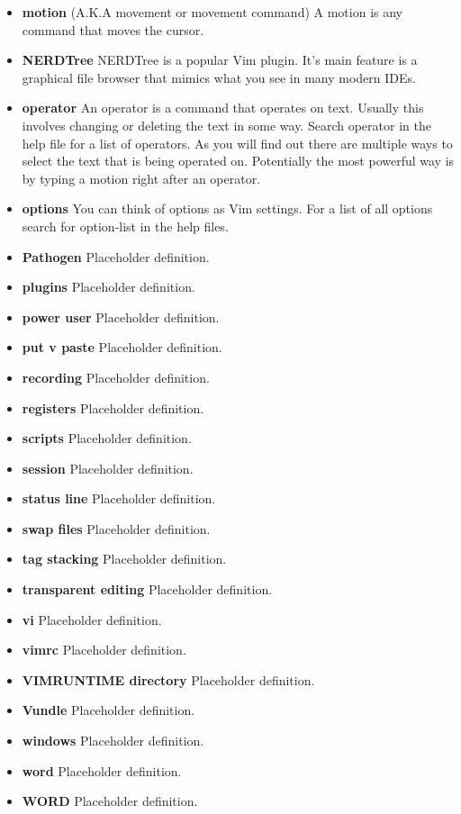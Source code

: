 \documentclass[12pt, oneside]{book}
\begin{document}
\begin{itemize}[leftmargin=*, label={}]
  \item \textbf{motion} (A.K.A movement or movement command) A motion is any command that moves the cursor.
  \item \textbf{NERDTree} NERDTree is a popular Vim plugin.  It's main feature is a graphical file browser that mimics what you see in many modern IDEs.
  \item \textbf{operator} An operator is a command that operates on text.  Usually this involves changing or deleting the text in some way.  Search operator in the help file for a list of operators.
    As you will find out there are multiple ways to select the text that is being operated on.  Potentially the most powerful way is by typing a motion right after an operator.
  \item \textbf{options} You can think of options as Vim settings.  For a list of all options search for option-list in the help files.
  \item \textbf{Pathogen} Placeholder definition.
  \item \textbf{plugins} Placeholder definition.
  \item \textbf{power user} Placeholder definition.
  \item \textbf{put v paste} Placeholder definition.
  \item \textbf{recording} Placeholder definition.
  \item \textbf{registers} Placeholder definition.
  \item \textbf{scripts} Placeholder definition.
  \item \textbf{session} Placeholder definition.
  \item \textbf{status line} Placeholder definition.
  \item \textbf{swap files} Placeholder definition.
  \item \textbf{tag stacking} Placeholder definition.
  \item \textbf{transparent editing} Placeholder definition.
  \item \textbf{vi} Placeholder definition.
  \item \textbf{vimrc} Placeholder definition.
  \item \textbf{VIMRUNTIME directory} Placeholder definition.
  \item \textbf{Vundle} Placeholder definition.
  \item \textbf{windows} Placeholder definition.
  \item \textbf{word} Placeholder definition.
  \item \textbf{WORD} Placeholder definition.

\end{itemize}
\end{document}
